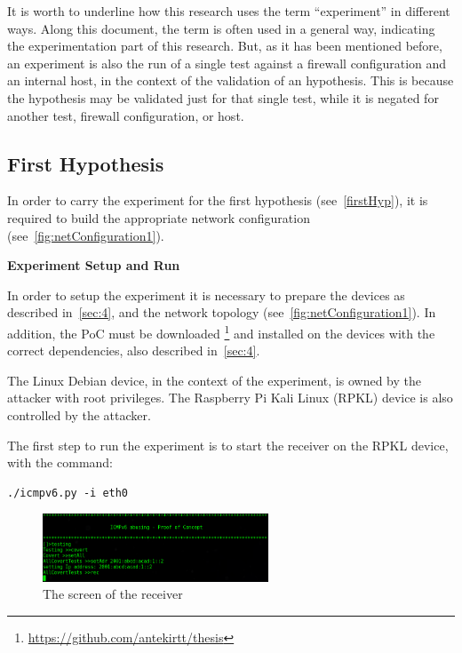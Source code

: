 \documentclass[12pt]{article}
\begin{document}
It is worth to underline how this research uses the term ``experiment'' in different ways. Along this document, the term is often used in a general way, indicating the experimentation part of this research. But, as it has been mentioned before, an experiment is also the run of a single test against a firewall configuration and an internal host, in the context of the validation of an hypothesis. This is because the hypothesis may be validated just for that single test, while it is negated for another test, firewall configuration, or host. 


\subsection{First Hypothesis}
\label{sub:firstHypExp}

In order to carry the experiment for the first hypothesis (see~\ref{firstHyp}), it is required to build the appropriate network configuration (see~\ref{fig:netConfiguration1}).

\textbf{Experiment Setup and Run}
\label{subsub:expRun}

In order to setup the experiment it is necessary to prepare the devices as described in~\ref{sec:4}, and the network topology (see~\ref{fig:netConfiguration1}). In addition, the PoC must be downloaded \footnote{\url{https://github.com/antekirtt/thesis}} and installed on the devices with the correct dependencies, also described in~\ref{sec:4}.

The Linux Debian device, in the context of the experiment, is owned by the attacker with root privileges. The Raspberry Pi Kali Linux (RPKL) device is also controlled by the attacker.

The first step to run the experiment is to start the receiver on the RPKL device, with the command:
\begin{lstlisting}[style=python,basicstyle=\ttfamily\small]
 ./icmpv6.py -i eth0
\end{lstlisting}

\begin{figure}[ht] 
\begin{center}
\includegraphics[width=0.6\textwidth]{runExpReceiver}
\caption{The screen of the receiver}
\label{fig:runExpRec}
\end{center}
\end{figure}
\end{document}
